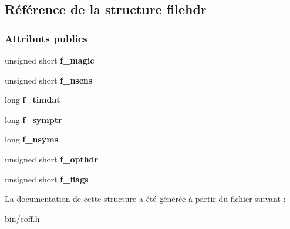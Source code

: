 \hypertarget{structfilehdr}{}\subsection{Référence de la structure filehdr}
\label{structfilehdr}
\subsubsection*{Attributs publics}
\begin{DoxyCompactItemize}
\item 
\hypertarget{structfilehdr_a97a52c5bac875ea0afb8eaa6c48b1d2f}{}\label{structfilehdr_a97a52c5bac875ea0afb8eaa6c48b1d2f} 
unsigned short {\bfseries f\+\_\+magic}
\item 
\hypertarget{structfilehdr_a8d7bc046274a19338a0cc76937c2a68c}{}\label{structfilehdr_a8d7bc046274a19338a0cc76937c2a68c} 
unsigned short {\bfseries f\+\_\+nscns}
\item 
\hypertarget{structfilehdr_aec745145c720ceebceefd28ab788ff31}{}\label{structfilehdr_aec745145c720ceebceefd28ab788ff31} 
long {\bfseries f\+\_\+timdat}
\item 
\hypertarget{structfilehdr_a7c855272af539edee2873319773fe51d}{}\label{structfilehdr_a7c855272af539edee2873319773fe51d} 
long {\bfseries f\+\_\+symptr}
\item 
\hypertarget{structfilehdr_a19a3d8196849aaa200cb6cf63574725a}{}\label{structfilehdr_a19a3d8196849aaa200cb6cf63574725a} 
long {\bfseries f\+\_\+nsyms}
\item 
\hypertarget{structfilehdr_ab803a1145d8cec4f9370741cda14f313}{}\label{structfilehdr_ab803a1145d8cec4f9370741cda14f313} 
unsigned short {\bfseries f\+\_\+opthdr}
\item 
\hypertarget{structfilehdr_ab7b30fd57faaf43e1cbec3e45bda619d}{}\label{structfilehdr_ab7b30fd57faaf43e1cbec3e45bda619d} 
unsigned short {\bfseries f\+\_\+flags}
\end{DoxyCompactItemize}


La documentation de cette structure a été générée à partir du fichier suivant \+:\begin{DoxyCompactItemize}
\item 
bin/coff.\+h\end{DoxyCompactItemize}
